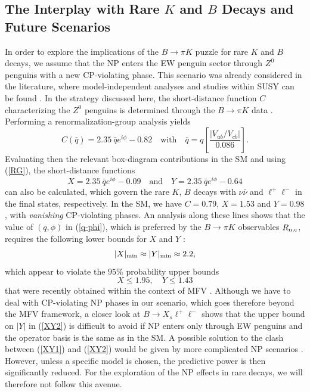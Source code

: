 \documentclass[12pt]{article}
\begin{document}
\subsection{The Interplay with Rare $K$ and $B$ Decays and
Future Scenarios}\label{ssec:rareKB}
\unboldmath
%
%
%
In order to explore the implications of the $B\to\pi K$ puzzle for rare 
$K$ and $B$ decays, we
assume that the NP enters the EW penguin sector through 
$Z^0$ penguins with a new CP-violating phase. This scenario was already
considered in the literature, where model-independent analyses and 
studies within SUSY can be found \cite{Z-pen-analyses,BuHi}.
In the strategy discussed here, the short-distance function $C$ characterizing 
the $Z^0$ penguins is determined through the $B\to\pi K$ data \cite{BFRS-I}. 
Performing a renormalization-group analysis yields
\begin{equation}\label{RG}
C(\bar q)= 2.35~ \bar q e^{i\phi} -0.82 \quad\mbox{with}\quad 
\bar q= q \left[\frac{|V_{ub}/V_{cb}|}{0.086}\right].
\end{equation}
Evaluating then the relevant box-diagram contributions in the SM 
and using (\ref{RG}), the short-distance functions
\begin{equation}\label{X-C-rel}
X=2.35~ \bar q e^{i\phi} -0.09 \quad \mbox{and} \quad 
Y=2.35~ \bar q e^{i\phi} -0.64
\end{equation}
can also be calculated, which govern the rare $K$, $B$ decays with $\nu\bar\nu$ 
and $\ell^+\ell^-$ in the final states, respectively. In the SM, we have 
$C=0.79$, $X=1.53$ and $Y=0.98$, with {\it vanishing} CP-violating phases. 
An analysis along these lines shows that the value of $(q,\phi)$ in (\ref{q-phi}), 
which is preferred by the $B\to\pi K$ observables $R_{\rm n,c}$, requires the 
following lower bounds for $X$ and $Y$ \cite{BFRS-5}:
\begin{equation}\label{XY1}
|X|_{\rm min}\approx 
|Y|_{\rm min}\approx 2.2,
\end{equation}
which appear to violate the $95\%$ probability upper bounds
\begin{equation}\label{XY2}
X\le 1.95, \quad Y\le 1.43
\end{equation}
that were recently obtained within the context of MFV \cite{Bobeth:2005ck}. 
Although we have to deal with CP-violating NP phases in our scenario,
which goes therefore beyond the MFV framework, a closer look at 
$B\to X_s \ell^+\ell^-$ shows that the upper 
bound on $|Y|$ in (\ref{XY2}) is difficult to avoid if NP enters only through
EW penguins  and the operator basis is the same as in the SM. A possible
solution to the clash between (\ref{XY1}) and (\ref{XY2}) would be given
by more complicated NP scenarios \cite{BFRS-5}. However, unless a specific 
model is chosen, the predictive power is then significantly reduced. For the
exploration of the NP effects in rare decays, we will therefore not follow
this avenue. 
\end{document}
